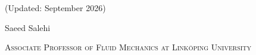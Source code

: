 \documentclass[a4paper,12pt]{article}
\begin{document}
\begin{flushright}
(Updated: September 2026)
\end{flushright}
{\centering\fontsize{30}{36}\selectfont Saeed Salehi\par}
\begin{center}
{\large\scshape\color{AccentColour} Associate Professor of Fluid Mechanics at Linköping University}
\end{center}















\end{document}
